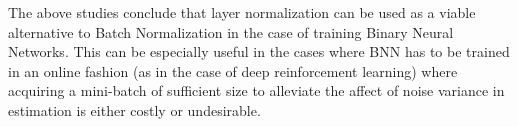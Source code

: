 The above studies conclude that layer normalization can be used as a viable alternative to Batch Normalization in the case of training Binary Neural Networks. This can be especially useful in the cases where BNN has to be trained in an online fashion (as in the case of deep reinforcement learning) where acquiring a mini-batch of sufficient size to alleviate the affect of noise variance in estimation is either costly or undesirable.

  
  




